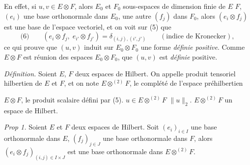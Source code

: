 \documentclass[11pt,a4paper]{article}
\begin{document}
En effet, si $u, v \in E \otimes F$, alors    $E_0$ et $F_0$ \struck{\ill{}}   sous-espaces de dimension finie de $E$   $F$,   $(e_i)$  une base orthonormale dans $E_0$, une autre $(f_j)$ dans $F_0$,  alors $(e_i \otimes f_j)$ est une base de l'espace vectoriel, et on voit sur (5) que
\[
  \text{(6)}\qquad (e_i \otimes f_j,\; e_{i'} \otimes f_{j'}) = \delta_{(i,j),(i',j')} \qquad (\text{indice de Kronecker}),
\]
ce qui prouve que $(u,v)$ induit sur $E_0 \otimes F_0$ une forme \emph{définie positive}. Comme $E \otimes F$ est réunion des espaces $E_0 \otimes F_0$,   que $(u,v)$ est \emph{définie} positive.

\emph{Définition.} Soient $E$, $F$ deux espaces de Hilbert. On appelle produit tensoriel hilbertien de $E$ et $F$, et on note $E \otimes^{(2)} F$, le complété de l'espace  préhilbertien

 $E \otimes F$, \struck{\ill{}} le produit scalaire  défini par (5).     \struck{\ill{}} $u \in E \otimes^{(2)} F$   $\|u\|_2$.  $E \otimes^{(2)} F$  un espace de Hilbert.

\emph{Prop 1.} Soient $E$ et $F$ deux espaces de Hilbert.  Soit $(e_i)_{i \in I}$ une base orthonormale dans $E$, $(f_j)_{j \in J}$ une base orthonormale dans $F$, alors $(e_i \otimes f_j)_{(i,j) \in I \times J}$ est une base orthonormale dans $E \otimes^{(2)} F$. 
\end{document}
